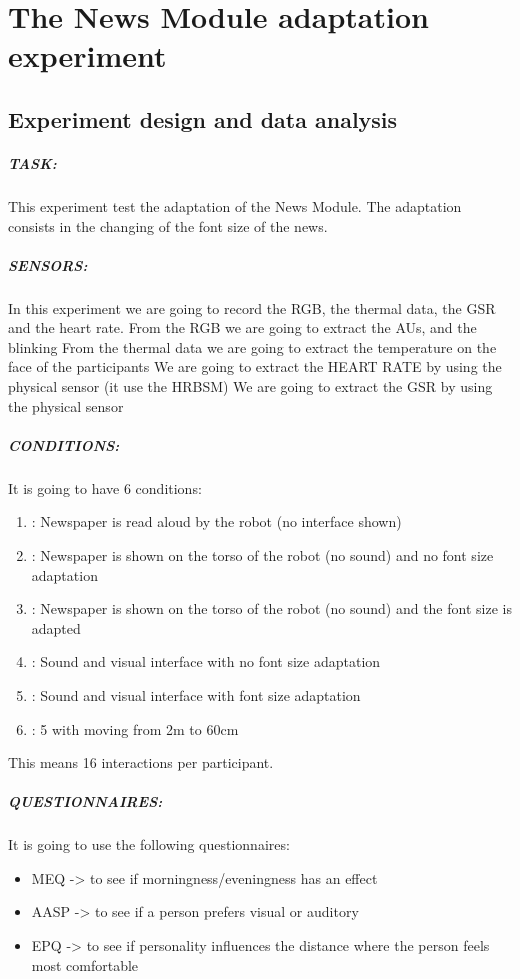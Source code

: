 \chapter{The News Module adaptation experiment}
\label{chapter:experiment}
\section{Experiment design and data analysis}
\paragraph{TASK:}
This experiment test the adaptation of the News Module. The adaptation consists in the changing of the font size of the news. 

\paragraph{SENSORS:}
In this experiment we are going to record the RGB, the thermal data, the GSR and the heart rate.
From the RGB we are going to extract the AUs, and the blinking
From the thermal data we are going to extract the temperature on the face of the participants
We are going to extract the HEART RATE by using the physical sensor (it use the HRBSM)
We are going to extract the GSR by using the physical sensor

\paragraph{CONDITIONS:}
It is going to have 6 conditions:
\begin{enumerate}
\item: Newspaper is read aloud by the robot (no interface shown)
\item: Newspaper is shown on the torso of the robot (no sound) and no font size adaptation
\item: Newspaper is shown on the torso of the robot (no sound) and the font size is adapted
\item: Sound and visual interface with no font size adaptation
\item: Sound and visual interface with font size adaptation
\item: 5 with moving from 2m to 60cm
\end{enumerate}
This means 16 interactions per participant.


\paragraph{QUESTIONNAIRES:}
It is going to use the following questionnaires:
\begin{itemize}
\item MEQ -> to see if morningness/eveningness has an effect
\item AASP -> to see if a person prefers visual or auditory
\item EPQ -> to see if personality influences the distance where the person feels most comfortable
\end{itemize}

